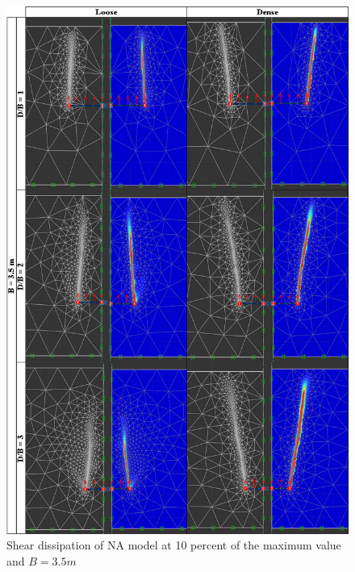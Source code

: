 \documentclass[a4paper, nobind]{templates/ociamthesis}
\begin{document}
\begin{figure}[H]
\includegraphics[width=1\linewidth]{myfigureeeeee/D_three_point_five} \caption{Shear dissipation of NA model at 10 percent of the maximum value and $B = 3.5m$}\label{fig:unnamed-chunk-28}
\end{figure}
\end{document}
